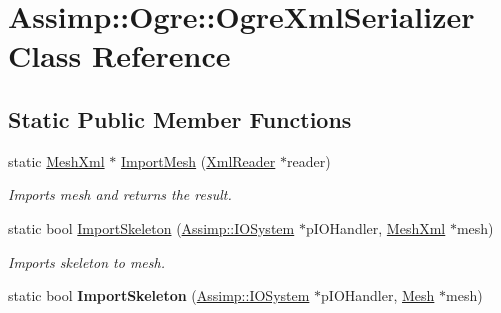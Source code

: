 \hypertarget{class_assimp_1_1_ogre_1_1_ogre_xml_serializer}{\section{Assimp\+:\+:Ogre\+:\+:Ogre\+Xml\+Serializer Class Reference}
\label{class_assimp_1_1_ogre_1_1_ogre_xml_serializer}
}
\subsection*{Static Public Member Functions}
\begin{DoxyCompactItemize}
\item 
static \hyperlink{class_assimp_1_1_ogre_1_1_mesh_xml}{Mesh\+Xml} $\ast$ \hyperlink{class_assimp_1_1_ogre_1_1_ogre_xml_serializer_a7034c4c99eb8db60da952258fe714588}{Import\+Mesh} (\hyperlink{classirr_1_1io_1_1_i_irr_x_m_l_reader}{Xml\+Reader} $\ast$reader)
\begin{DoxyCompactList}\small\item\em Imports mesh and returns the result. \end{DoxyCompactList}\item 
static bool \hyperlink{class_assimp_1_1_ogre_1_1_ogre_xml_serializer_a8768129eca3de6502e99beca0ad4f2a1}{Import\+Skeleton} (\hyperlink{class_assimp_1_1_i_o_system}{Assimp\+::\+I\+O\+System} $\ast$p\+I\+O\+Handler, \hyperlink{class_assimp_1_1_ogre_1_1_mesh_xml}{Mesh\+Xml} $\ast$mesh)
\begin{DoxyCompactList}\small\item\em Imports skeleton to {\ttfamily mesh}. \end{DoxyCompactList}\item 
\hypertarget{class_assimp_1_1_ogre_1_1_ogre_xml_serializer_aba51b2f1922ceda907547c7ab0b23049}{static bool {\bfseries Import\+Skeleton} (\hyperlink{class_assimp_1_1_i_o_system}{Assimp\+::\+I\+O\+System} $\ast$p\+I\+O\+Handler, \hyperlink{class_assimp_1_1_ogre_1_1_mesh}{Mesh} $\ast$mesh)}\label{class_assimp_1_1_ogre_1_1_ogre_xml_serializer_aba51b2f1922ceda907547c7ab0b23049}

\end{DoxyCompactItemize}


